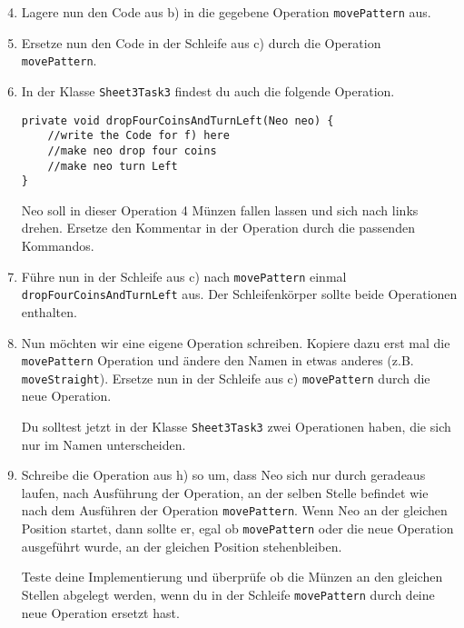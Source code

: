 \begin{enumerate}\setcounter{enumi}{3}
	\item 
		Lagere nun den Code aus b) in die gegebene Operation \lstinline{movePattern} aus.

	\item
		Ersetze nun den Code in der Schleife aus c) durch die Operation \lstinline{movePattern}.

	\item
		In der Klasse \lstinline{Sheet3Task3} findest du auch die folgende Operation.

		\begin{lstlisting}
private void dropFourCoinsAndTurnLeft(Neo neo) {
    //write the Code for f) here
    //make neo drop four coins
    //make neo turn Left
}
		\end{lstlisting}

		Neo soll in dieser Operation 4 Münzen fallen lassen und sich nach links drehen. 
		Ersetze den Kommentar in der Operation durch die passenden Kommandos.

	\item
		Führe nun in der Schleife aus c) nach \lstinline{movePattern} einmal \lstinline{dropFourCoinsAndTurnLeft} aus.
		Der Schleifenkörper sollte beide Operationen enthalten.

	\item
		Nun möchten wir eine eigene Operation schreiben. 
		Kopiere dazu erst mal die \lstinline{movePattern} Operation und ändere den Namen in etwas anderes (z.B. \lstinline{moveStraight}).
		Ersetze nun in der Schleife aus c) \lstinline{movePattern} durch die neue Operation.

		Du solltest jetzt in der Klasse \lstinline{Sheet3Task3} zwei Operationen haben, die sich nur im Namen unterscheiden.

	\item
		Schreibe die Operation aus h) so um, dass Neo sich nur durch geradeaus laufen, nach Ausführung der Operation, an der selben Stelle befindet wie nach dem Ausführen der Operation \lstinline{movePattern}.
		Wenn Neo an der gleichen Position startet, dann sollte er, egal ob \lstinline{movePattern} oder die neue Operation ausgeführt wurde, an der gleichen Position stehenbleiben.

		Teste deine Implementierung und überprüfe ob die Münzen an den gleichen Stellen abgelegt werden, wenn du in der Schleife \lstinline{movePattern} durch deine neue Operation ersetzt hast.
\end{enumerate}
\newpage
